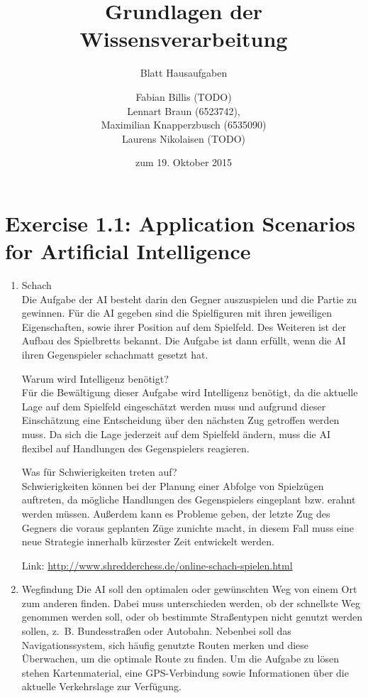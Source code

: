 \documentclass[a4paper]{scrartcl}
\title{Grundlagen der Wissensverarbeitung}
\subtitle{Blatt \blattnr Hausaufgaben}
\author{
    Fabian Billis (TODO) \\
    Lennart Braun (6523742), \\
    Maximilian Knapperzbusch (6535090) \\
    Laurens Nikolaisen (TODO)
}
\date{zum 19. Oktober 2015}
\begin{document}
\maketitle

\section*{Exercise 1.1: Application Scenarios for Artificial Intelligence}
  \begin{enumerate}
    \item{Schach} \\
      Die Aufgabe der AI besteht darin den Gegner auszuspielen und die Partie
      zu gewinnen. Für die AI gegeben sind die Spielfiguren mit ihren
      jeweiligen Eigenschaften, sowie ihrer Position auf dem Spielfeld. Des
      Weiteren ist der Aufbau des Spielbretts bekannt.  Die Aufgabe ist dann
      erfüllt, wenn die AI ihren Gegenspieler schachmatt gesetzt hat.

      Warum wird Intelligenz benötigt? \\
      Für die Bewältigung dieser Aufgabe wird Intelligenz benötigt, da die
      aktuelle Lage auf dem Spielfeld eingeschätzt werden muss und aufgrund
      dieser Einschätzung eine Entscheidung über den nächsten Zug getroffen
      werden muss. Da sich die Lage jederzeit auf dem Spielfeld ändern, muss
      die AI flexibel auf Handlungen des Gegenspielers reagieren.

      Was für Schwierigkeiten treten auf?\\
      Schwierigkeiten können bei der Planung einer Abfolge von Spielzügen
      auftreten, da mögliche Handlungen des Gegenspielers eingeplant bzw.
      erahnt werden müssen.  Außerdem kann es Probleme geben, der letzte Zug
      des Gegners die voraus geplanten Züge zunichte macht, in diesem Fall muss
      eine neue Strategie innerhalb kürzester Zeit entwickelt werden.

      Link: \url{http://www.shredderchess.de/online-schach-spielen.html}

    \item{Wegfindung}
      Die AI soll den optimalen oder gewünschten Weg von einem Ort zum anderen
      finden.  Dabei muss unterschieden werden, ob der schnellste Weg genommen
      werden soll, oder ob bestimmte Straßentypen nicht genutzt werden sollen,
      z.~B. Bundesstraßen oder Autobahn. Nebenbei soll das Navigationssystem,
      sich häufig genutzte Routen merken und diese Überwachen, um die optimale
      Route zu finden. Um die Aufgabe zu lösen stehen Kartenmaterial, eine
      GPS-Verbindung sowie Informationen über die aktuelle Verkehrslage zur
      Verfügung.


\end{enumerate}
\end{document}
